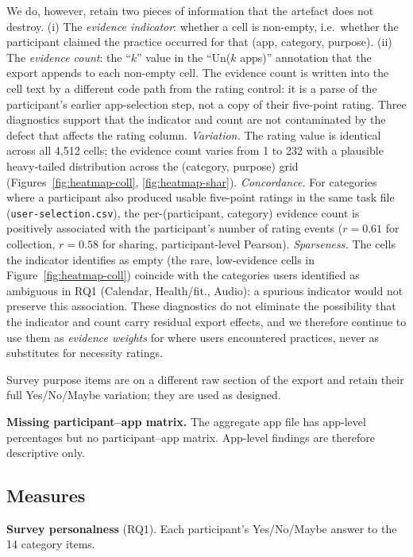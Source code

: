 \documentclass[11pt,a4paper]{article}
\begin{document}
We do, however, retain two pieces of information that the artefact
does not destroy. (i) The \emph{evidence indicator}: whether a cell is
non-empty, i.e.\ whether the participant claimed the practice occurred
for that (app, category, purpose). (ii) The \emph{evidence count}: the
``$k$'' value in the ``Un($k$ apps)'' annotation that the export
appends to each non-empty cell. The evidence count is written into the
cell text by a different code path from the rating control: it is a
parse of the participant's earlier app-selection step, not a copy of
their five-point rating. Three diagnostics support that the indicator
and count are not contaminated by the defect that affects the rating
column. \emph{Variation.} The rating value is identical across all
4{,}512 cells; the evidence count varies from 1 to 232 with a
plausible heavy-tailed distribution across the (category, purpose)
grid (Figures~\ref{fig:heatmap-coll}, \ref{fig:heatmap-shar}).
\emph{Concordance.} For categories where a participant also produced
usable five-point ratings in the same task file
(\texttt{user-selection.csv}), the per-(participant, category)
evidence count is positively associated with the participant's number
of rating events ($r=0.61$ for collection, $r=0.58$ for sharing,
participant-level Pearson). \emph{Sparseness.} The cells the indicator
identifies as empty (the rare, low-evidence cells in
Figure~\ref{fig:heatmap-coll}) coincide with the categories users
identified as ambiguous in RQ1 (Calendar, Health/fit., Audio): a
spurious indicator would not preserve this association. These
diagnostics do not eliminate the possibility that the indicator and
count carry residual export effects, and we therefore continue to use
them as \emph{evidence weights} for where users encountered practices,
never as substitutes for necessity ratings.

Survey purpose items are on a different raw section of the export and
retain their full Yes/No/Maybe variation; they are used as designed.

\textbf{Missing participant--app matrix.} The aggregate app file has
app-level percentages but no participant--app matrix. App-level
findings are therefore descriptive only.

\subsection{Measures}
\label{subsec:measures-derived}

\textbf{Survey personalness} (RQ1). Each participant's Yes/No/Maybe
answer to the 14 category items.
\end{document}

